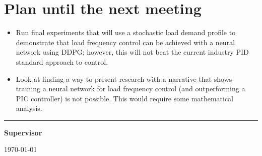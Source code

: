 \documentclass[12pt]{article}
\begin{document}
	\section{Plan until the next meeting}
	\begin{itemize}
		\item Run final experiments that will use a stochastic load demand profile to demonstrate that load frequency control can be achieved with a neural network using DDPG; however, this will not beat the current industry PID standard approach to control.
		\item Look at finding a way to present research with a narrative that shows training a neural network for load frequency control (and outperforming a PIC controller) is not possible. This would require some mathematical analysis.
	\end{itemize}
	\par
	\vspace{\fill}%
	\noindent\rule{0.4\linewidth}{0.5pt}%
	\vspace{1em}%
	\par
	\noindent\textbf{Supervisor}\vspace{1em}%
	\par
	\noindent\today
\end{document}
